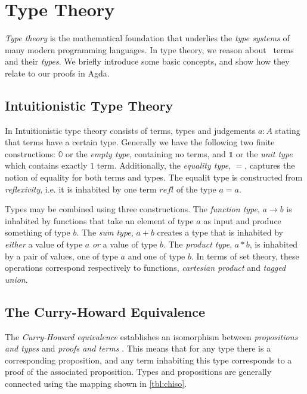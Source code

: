 \documentclass[a4paper,msc,twosized=semi]{uustthesis}
\begin{document}
\section{Type Theory}

  \emph{Type theory} is the mathematical foundation that underlies the \emph{type 
  systems} of many modern programming languages. In type theory, we reason about \emph\
  {terms} and their \emph{types}. We briefly introduce some basic concepts, and show 
  how they relate to our proofs in Agda. 

  \subsection{Intuitionistic Type Theory}

  In Intuitionistic type theory consists of terms, types and judgements $a : A$ 
  stating that terms have a certain type. Generally we have the following two finite 
  constructions: $\mathbb{0}$ or the \emph{empty type}, containing no terms, and 
  $\mathbb{1}$ or the \emph{unit type} which contains exactly $1$ term. Additionally,
  the \emph{equality type}, $=$, captures the notion of equality for both terms and 
  types. The equalit type is constructed from \emph{reflexivity}, i.e. it is 
  inhabited by one term $refl$ of the type $a = a$. 

  Types may be combined using three constructions. The \emph{function type}, $a 
  \rightarrow b$ is inhabited by functions that take an element of type $a$ as input 
  and produce something of type $b$. The \emph{sum type}, $a + b$ creates a type that 
  is inhabited by \emph{either} a value of type $a$ \emph{or} a 
  value of type $b$. The \emph{product type}, $a * b$, is inhabited by a pair of 
  values, one of type $a$ and one of type $b$. In terms of set theory, these 
  operations correspond respectively to functions, \emph{cartesian product} and \emph
  {tagged union}. 

  \subsection{The Curry-Howard Equivalence}

  The \emph{Curry-Howard equivalence} establishes an isomorphism between \emph
  {propositions and types} and \emph{proofs and terms} \cite{wadler2015propositions}. 
  This means that for any type there is a corresponding proposition, and any term 
  inhabiting this type corresponds to a proof of the associated proposition. Types and 
  propositions are generally connected using the mapping shown in \cref{tbl:chiso}.
\end{document}
